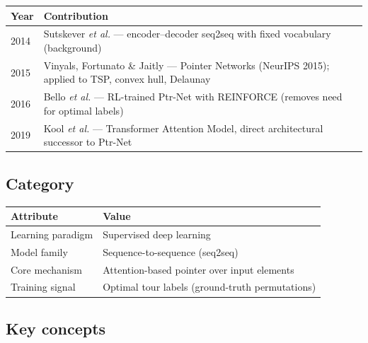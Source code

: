 \documentclass[12pt,a4paper]{article}
\begin{document}
\begin{center}
\begin{tabularx}{\linewidth}{lX}
\toprule
\textbf{Year} & \textbf{Contribution} \\
\midrule
2014 & Sutskever \textit{et al.} --- encoder--decoder seq2seq with fixed
       vocabulary (background) \\
2015 & Vinyals, Fortunato \& Jaitly --- Pointer Networks
       (NeurIPS 2015); applied to TSP, convex hull, Delaunay \\
2016 & Bello \textit{et al.} --- RL-trained Ptr-Net with REINFORCE
       (removes need for optimal labels) \\
2019 & Kool \textit{et al.} --- Transformer Attention Model,
       direct architectural successor to Ptr-Net \\
\bottomrule
\end{tabularx}
\end{center}

\subsection*{Category}

\begin{center}
\begin{tabularx}{\linewidth}{lX}
\toprule
\textbf{Attribute} & \textbf{Value} \\
\midrule
Learning paradigm & Supervised deep learning \\
Model family & Sequence-to-sequence (seq2seq) \\
Core mechanism & Attention-based pointer over input elements \\
Training signal & Optimal tour labels (ground-truth permutations) \\
\bottomrule
\end{tabularx}
\end{center}

\subsection*{Key concepts}
\end{document}
